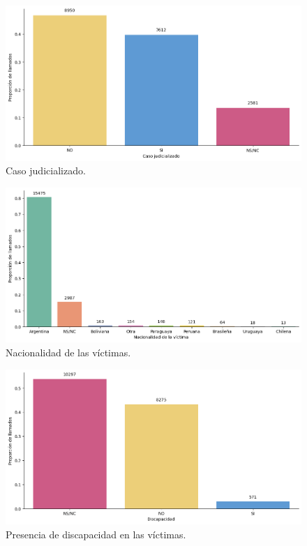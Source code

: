\documentclass[10 pt]{article}
\begin{document}
\begin{figure}[H]
\begin{center}
\includegraphics[scale=.5]{images/latex_caso_judicializado.png}
\caption{Caso judicializado.}
\label{casojudicializado}
\end{center}
\end{figure}


\begin{figure}[H]
\begin{center}
\includegraphics[scale=.5]{images/latex_nacionalidad_victima.png}
\caption{Nacionalidad de las víctimas.}
\label{nacionalidad}
\end{center}
\end{figure}



\begin{figure}[H]
\begin{center}
\includegraphics[scale=.5]{images/latex_victima_discapacidad.png}
\caption{Presencia de discapacidad en las víctimas.}
\label{discapacidad}
\end{center}
\end{figure}
\end{document}
